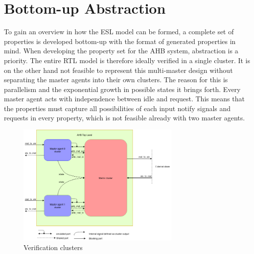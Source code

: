 \label{ch:design}

\section{Bottom-up Abstraction}
\label{sec:bottom-up}
To gain an overview in how the ESL model can be formed, a complete set of properties is developed bottom-up with the format of generated properties in mind.
When developing the property set for the AHB system, abstraction is a priority. The entire RTL model is therefore ideally verified in a single cluster. 
It is on the other hand not feasible to represent this multi-master design without separating the master agents into their own clusters. The reason for this is 
parallelism and the exponential growth in possible states it brings forth. Every master agent acts with independence between idle and request. This means that the properties must capture all possibilities of each input notify signals and requests in every property, which is not feasible already with two master agents.
\begin{figure}
\includegraphics[width=8cm]{figs/Verif/Verif_block.png}
\caption{Verification clusters}\label{fig:verif-clust}
\end{figure} 

